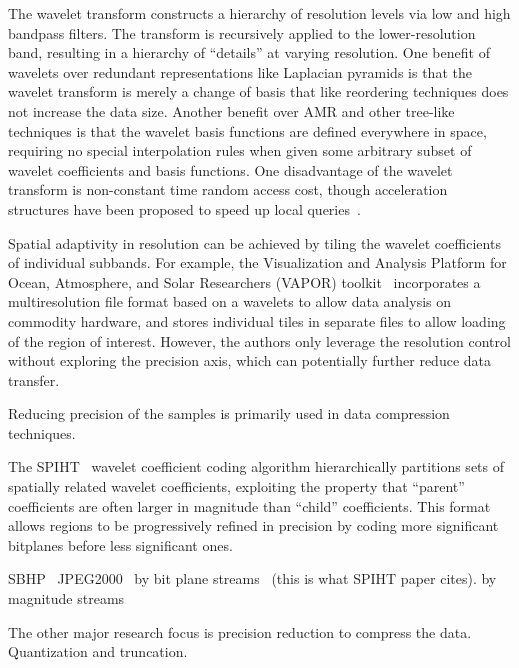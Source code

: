 The wavelet transform constructs a hierarchy of resolution levels via low and high bandpass filters.
The transform is recursively applied to the lower-resolution band, resulting in a hierarchy of
``details'' at varying resolution. One benefit of wavelets over redundant representations like
Laplacian pyramids is that the wavelet transform is merely a change of basis that like reordering
techniques does not increase the data size. Another benefit over AMR and other tree-like techniques
is that the wavelet basis functions are defined everywhere in space, requiring no special
interpolation rules when given some arbitrary subset of wavelet coefficients and basis functions.
One disadvantage of the wavelet transform is non-constant time random access cost, though
acceleration structures have been proposed to speed up local queries~\cite{weiss}.

Spatial adaptivity in resolution can be achieved by tiling the wavelet coefficients of individual
subbands. For example, the Visualization and Analysis Platform for Ocean, Atmosphere, and Solar
Researchers (VAPOR) toolkit~\cite{multires_toolkit2003, vapor2007} incorporates a multiresolution
file format based on a wavelets to allow data analysis on commodity hardware, and stores individual
tiles in separate files to allow loading of the region of interest. However, the authors only
leverage the resolution control without exploring the precision axis, which can potentially further
reduce data transfer.

Reducing precision of the samples is primarily used in data compression techniques. 

The SPIHT~\cite{spiht1996} wavelet coefficient coding algorithm hierarchically partitions sets of
spatially related wavelet coefficients, exploiting the property that ``parent'' coefficients are
often larger in magnitude than ``child'' coefficients. This format allows regions to be
progressively refined in precision by coding more significant bitplanes before less significant
ones.

SBHP~\cite{sbhp2000}
JPEG2000~\cite{jpeg2001}
by bit plane streams~\cite{compression_techniques1991} (this is what SPIHT paper cites).
by magnitude streams~\cite{image_compression1992}

The other major research focus is precision reduction to compress the data. Quantization and
truncation.


